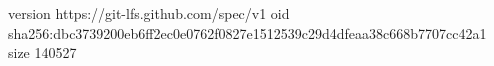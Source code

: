version https://git-lfs.github.com/spec/v1
oid sha256:dbc3739200eb6ff2ec0e0762f0827e1512539c29d4dfeaa38c668b7707cc42a1
size 140527
